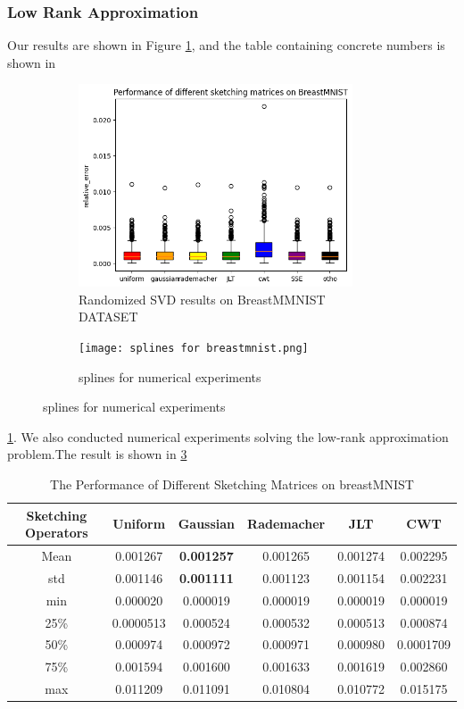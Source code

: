 \documentclass{article}
\begin{document}
\subsubsection{Low Rank Approximation}
\label{sec:results_low_rank_apprximation}
Our results are shown in Figure \ref{fig:results on breastmnist boxplot}, and the table containing concrete numbers is shown in 
\begin{figure}[h]
\begin{subfigure}
    {0.5\textwidth}\includegraphics[width=0.9\linewidth,height=6cm]{figures/boxplot_BREASTMNIST.png}
    \caption{Randomized SVD results on BreastMMNIST DATASET}
    \label{fig:results on breastmnist boxplot}
    \end{subfigure}
    \begin{subfigure}
    {0.5\textwidth}\texttt{[image: splines for breastmnist.png]}
    \caption{splines for numerical experiments}
    \label{fig:m1_lowrank}
\end{subfigure}
\end{figure}
\ref{tab:table for descriptions}. We also conducted numerical experiments solving the low-rank approximation problem.The result is shown in \ref{fig:m1_lowrank}

\begin{table}
    \centering
    \begin{tabular}{cccccc}
      Sketching Operators   &Uniform  &Gaussian  &Rademacher  & JLT & CWT\\
      \hline
       Mean  &0.001267  & \textbf{0.001257} & 0.001265 & 0.001274 &0.002295 \\
       \hline
       std  & 0.001146 & \textbf{0.001111} & 0.001123 & 0.001154 &0.002231 \\
       \hline
        min & 0.000020 & 0.000019 & 0.000019 & 0.000019 &0.000019 \\
        \hline
        25\% & 0.0000513 & 0.000524 & 0.000532 & 0.000513 & 0.000874\\
        \hline
        50\% &0.000974  & 0.000972 & 0.000971 & 0.000980 & 0.0001709\\
        \hline
        75\% &0.001594 & 0.001600 & 0.001633 & 0.001619 & 0.002860\\
        \hline
        max & 0.011209 & 0.011091 & 0.010804 & 0.010772 &0.015175 \\
    \end{tabular}
    \caption{The Performance of Different Sketching Matrices on breastMNIST}
    \label{tab:table for descriptions}
\end{table}
\end{document}
